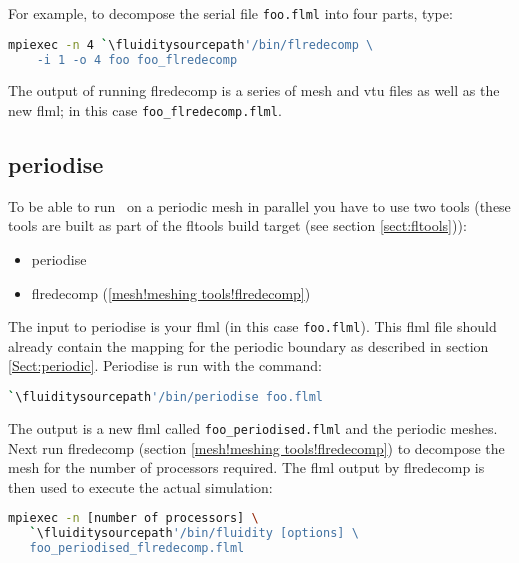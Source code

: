 For example, to decompose the serial file \lstinline+foo.flml+
into four parts, type:

\begin{lstlisting}[language=bash]
mpiexec -n 4 `\fluiditysourcepath'/bin/flredecomp \
    -i 1 -o 4 foo foo_flredecomp
\end{lstlisting}

The output of running flredecomp is a series of mesh and vtu files as well
as the new flml; in this case \lstinline+foo_flredecomp.flml+.

\subsection{periodise}
\label{sect:decomposing_meshes_periodise}

To be able to run \fluidity\ on a periodic mesh in parallel you have to use
two tools (these tools are built as part of the fltools build target (see
section \ref{sect:fltools})):

\begin{itemize}
\item periodise
\item flredecomp (\ref{mesh!meshing tools!flredecomp})
\end{itemize}

The input to periodise is your flml (in this case
\lstinline{foo.flml}). This flml file should already contain the mapping for
the periodic boundary as described in section
\ref{Sect:periodic}. Periodise is run with the command:

\begin{lstlisting}[language=bash]
`\fluiditysourcepath'/bin/periodise foo.flml
\end{lstlisting}

The output is a new flml called \lstinline+foo_periodised.flml+ and the
periodic meshes. Next run flredecomp (section \ref{mesh!meshing
  tools!flredecomp}) to decompose the mesh for the number of processors
required. The flml output by flredecomp is then used to execute the actual simulation:

\begin{lstlisting}[language=bash]
mpiexec -n [number of processors] \
   `\fluiditysourcepath'/bin/fluidity [options] \
   foo_periodised_flredecomp.flml
\end{lstlisting}

